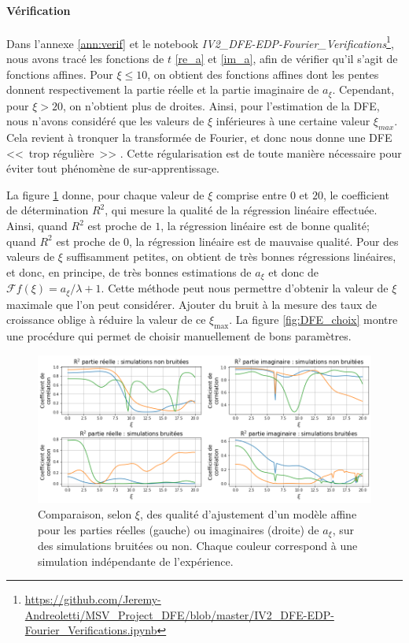 \documentclass[12pt]{article}
\newcommand{\fr}{\mathcal{F}}
\begin{document}
\paragraph{Vérification} Dans l'annexe \ref{ann:verif} et le notebook \emph{IV2\_DFE-EDP-Fourier\_Verifications}\footnote{\url{https://github.com/Jeremy-Andreoletti/MSV_Project_DFE/blob/master/IV2_DFE-EDP-Fourier_Verifications.ipynb}}, nous avons tracé les fonctions de $t$ \eqref{re_a} et \eqref{im_a}, afin de vérifier qu'il s'agit de fonctions affines. Pour $\xi\leqslant 10$, on obtient des fonctions affines dont les pentes donnent respectivement la partie réelle et la partie imaginaire de $a_{\xi}$. Cependant, pour $\xi>20$, on n'obtient plus de droites. Ainsi, pour l'estimation de la DFE, nous n'avons considéré que les valeurs de $\xi$ inférieures à une certaine valeur $\xi_{max}$. Cela revient à tronquer la transformée de Fourier, et donc nous donne une DFE <<~trop régulière~>> . Cette régularisation est de toute manière nécessaire pour éviter tout phénomène de sur-apprentissage.

La figure \ref{fig:DFE_R2} donne, pour chaque valeur de $\xi$ comprise entre $0$ et $20$, le coefficient de détermination $R^2$, qui mesure la qualité de la régression linéaire effectuée. Ainsi, quand $R^2$ est proche de $1$, la régression linéaire est de bonne qualité; quand $R^2$ est proche de $0$, la régression linéaire est de mauvaise qualité. Pour des valeurs de $\xi$ suffisamment petites, on obtient de très bonnes régressions linéaires, et donc, en principe, de très bonnes estimations de $a_{\xi}$ et donc de $\fr f(\xi)=a_{\xi}/\lambda+1$. Cette méthode peut nous permettre d'obtenir la valeur de $\xi$ maximale que l'on peut considérer. Ajouter du bruit à la mesure des taux de croissance oblige à réduire la valeur de ce $\xi_{\max}$. La figure \ref{fig:DFE_choix} montre une procédure qui permet de choisir manuellement de bons paramètres.


\begin{figure}[h]
  \begin{center}
    \includegraphics[width=0.95\linewidth]{../Img/DFE_R2.png}
  \end{center}
  \caption{\label{fig:DFE_R2}Comparaison, selon $\xi$, des qualité d'ajustement d'un modèle affine pour les parties réelles (gauche) ou imaginaires (droite) de $a_{\xi}$, sur des simulations bruitées ou non. Chaque couleur correspond à une simulation indépendante de l'expérience.}
\end{figure}
\end{document}
